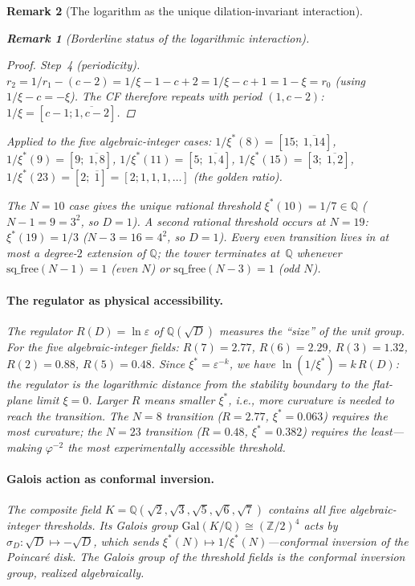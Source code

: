 \documentclass[12pt, a4paper]{article}
\newtheorem{remark}{Remark}[section]
\numberwithin{equation}{section}
\begin{document}
\begin{remark}[The logarithm as the unique dilation-invariant interaction]
\begin{remark}[Borderline status of the logarithmic interaction]
\begin{proof}
\emph{Step~4 (periodicity).}
$r_2 = 1/r_1 - (c{-}2) = 1/\xi - 1 - c + 2 = 1/\xi - c + 1 = 1 - \xi = r_0$
(using $1/\xi - c = -\xi$).  The CF therefore repeats with
period $(1, c{-}2)$:
$1/\xi = [c{-}1; \overline{1, c{-}2}]$.
\end{proof}

Applied to the five algebraic-integer cases:
$1/\xi^*(8) = [15;\;\overline{1, 14}]$,
$1/\xi^*(9) = [9;\;\overline{1, 8}]$,
$1/\xi^*(11) = [5;\;\overline{1, 4}]$,
$1/\xi^*(15) = [3;\;\overline{1, 2}]$,
$1/\xi^*(23) = [2;\;\overline{1}] = [2; 1, 1, 1, \ldots]$
(the golden ratio).

The $N = 10$ case gives the unique rational threshold
$\xi^*(10) = 1/7 \in \mathbb{Q}$
($N{-}1 = 9 = 3^2$, so $D = 1$).  A second rational threshold
occurs at $N = 19$: $\xi^*(19) = 1/3$
($N{-}3 = 16 = 4^2$, so $D = 1$).  Every even transition lives
in at most a degree-$2$ extension of $\mathbb{Q}$; the tower
terminates at~$\mathbb{Q}$ whenever
$\mathrm{sq\_free}(N{-}1) = 1$ (even $N$) or
$\mathrm{sq\_free}(N{-}3) = 1$ (odd $N$).

\paragraph{The regulator as physical accessibility.}
The regulator $R(D) = \ln\varepsilon$ of $\mathbb{Q}(\sqrt{D})$
measures the ``size'' of the unit group.  For the five
algebraic-integer fields:
$R(7) = 2.77$, $R(6) = 2.29$, $R(3) = 1.32$, $R(2) = 0.88$,
$R(5) = 0.48$.
Since $\xi^* = \varepsilon^{-k}$, we have
$\ln(1/\xi^*) = k\,R(D)$: the regulator is the logarithmic
distance from the stability boundary to the flat-plane limit
$\xi = 0$.  Larger $R$ means smaller $\xi^*$, i.e., more
curvature is needed to reach the transition.
The $N = 8$ transition ($R = 2.77$, $\xi^* = 0.063$) requires
the most curvature; the $N = 23$ transition ($R = 0.48$,
$\xi^* = 0.382$) requires the least---making
$\varphi^{-2}$ the most experimentally accessible threshold.

\paragraph{Galois action as conformal inversion.}
The composite field
$K = \mathbb{Q}(\sqrt{2}, \sqrt{3}, \sqrt{5}, \sqrt{6}, \sqrt{7})$
contains all five algebraic-integer thresholds.
Its Galois group $\mathrm{Gal}(K/\mathbb{Q}) \cong (\mathbb{Z}/2)^4$
acts by $\sigma_D\colon \sqrt{D} \mapsto -\sqrt{D}$, which sends
$\xi^*(N) \mapsto 1/\xi^*(N)$---conformal inversion of the
Poincar\'e disk.  The Galois group of the threshold fields
\emph{is} the conformal inversion group, realized algebraically.


\end{remark}
\end{remark}
\end{document}
